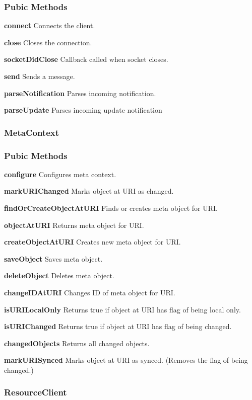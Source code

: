 \subsubsection*{Pubic Methods}
\item
\textbf{connect}
Connects the client.
\item
\textbf{close}
Closes the connection.
\item
\textbf{socketDidClose}
Callback called when socket closes.
\item
\textbf{send}
Sends a message.
\item
\textbf{parseNotification}
Parses incoming notification.
\item
\textbf{parseUpdate}
Parses incoming update notification

\subsubsection{MetaContext}
\subsubsection*{Pubic Methods}
\item
\textbf{configure}
Configures meta context.
\item
\textbf{markURIChanged}
Marks object at URI as changed.
\item
\textbf{findOrCreateObjectAtURI}
Finds or creates meta object for URI.
\item
\textbf{objectAtURI}
Returns meta object for URI.
\item
\textbf{createObjectAtURI}
Creates new meta object for URI.
\item
\textbf{saveObject}
Saves meta object.
\item
\textbf{deleteObject}
Deletes meta object.
\item
\textbf{changeIDAtURI}
Changes ID of meta object for URI.
\item
\textbf{isURILocalOnly}
Returns true if object at URI has flag of being local only.
\item
\textbf{isURIChanged}
Returns true if object at URI has flag of being changed.
\item
\textbf{changedObjects}
Returns all changed objects.
\item
\textbf{markURISynced}
Marks object at URI as synced. (Removes the flag of being changed.)

\subsubsection{ResourceClient}

